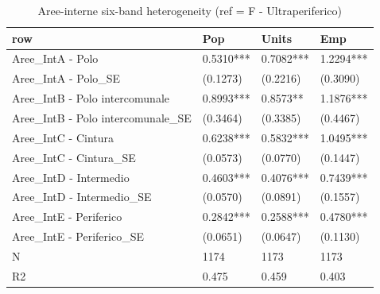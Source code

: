 \begin{table}

\caption{Aree-interne six-band heterogeneity (ref = F - Ultraperiferico)}
\centering
\begin{tabular}[t]{llll}
\toprule
row & Pop & Units & Emp\\
\midrule
Aree\_IntA - Polo & 0.5310*** & 0.7082*** & 1.2294***\\
Aree\_IntA - Polo\_SE & (0.1273) & (0.2216) & (0.3090)\\
Aree\_IntB - Polo intercomunale & 0.8993*** & 0.8573** & 1.1876***\\
Aree\_IntB - Polo intercomunale\_SE & (0.3464) & (0.3385) & (0.4467)\\
Aree\_IntC - Cintura & 0.6238*** & 0.5832*** & 1.0495***\\
\addlinespace
Aree\_IntC - Cintura\_SE & (0.0573) & (0.0770) & (0.1447)\\
Aree\_IntD - Intermedio & 0.4603*** & 0.4076*** & 0.7439***\\
Aree\_IntD - Intermedio\_SE & (0.0570) & (0.0891) & (0.1557)\\
Aree\_IntE - Periferico & 0.2842*** & 0.2588*** & 0.4780***\\
Aree\_IntE - Periferico\_SE & (0.0651) & (0.0647) & (0.1130)\\
\addlinespace
N & 1174 & 1173 & 1173\\
R2 & 0.475 & 0.459 & 0.403\\
\bottomrule
\end{tabular}
\end{table}
